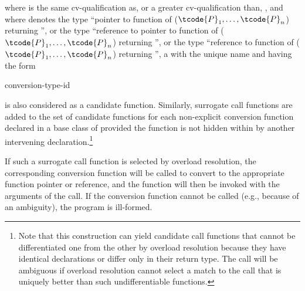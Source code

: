 where
is the same cv-qualification as, or a greater cv-qualification than,
\cv{},
and where
denotes the type ``pointer to function
of ($\tcode{P}_1, \dotsc, \tcode{P}_n$) returning '',
or the type ``reference to pointer to function
of ($\tcode{P}_1, \dotsc, \tcode{P}_n$) returning '',
or the type
``reference to function of ($\tcode{P}_1, \dotsc, \tcode{P}_n$)
returning '', a  with the unique name
and having the form

\begin{ncbnf}
  \terminal{(} conversion-type-id \ %
 
\end{ncbnf}

is also considered as a candidate function.
Similarly, surrogate
call functions are added to the set of candidate functions for
each non-explicit conversion function declared in a base class of
provided the function is not hidden within
by another
intervening declaration.\footnote{Note that this construction can yield
candidate call functions that cannot be
differentiated one from the other by overload resolution because they have
identical
declarations or differ only in their return type.
The call will be ambiguous
if overload
resolution cannot select a match to the call that is uniquely better than such
undifferentiable functions.}

\pnum
If such a surrogate call function is selected by overload
resolution, the corresponding conversion function will be called to convert
to the appropriate function pointer or reference, and the function
will then be invoked with the arguments of the call. If the
conversion function cannot be called (e.g., because of an ambiguity),
the program is ill-formed.

